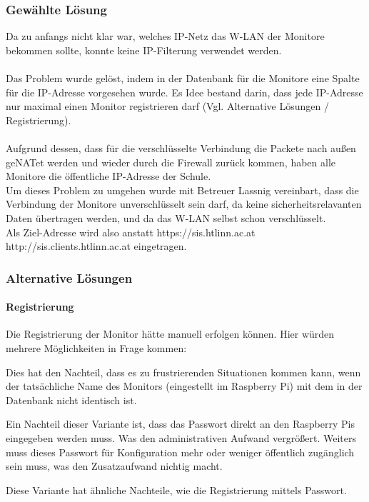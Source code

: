 \subsubsection{Gewählte Lösung}

Da zu anfangs nicht klar war, welches IP-Netz das W-LAN der Monitore bekommen sollte, konnte keine IP-Filterung verwendet werden.\\
\\
Das Problem wurde gelöst, indem in der Datenbank für die Monitore eine Spalte für die IP-Adresse vorgesehen wurde. Es Idee bestand darin, dass jede IP-Adresse nur maximal einen Monitor registrieren darf (Vgl. Alternative Lösungen / Registrierung).\\
\\
Aufgrund dessen, dass für die verschlüsselte Verbindung die Packete nach außen geNATet werden und wieder durch die Firewall zurück kommen, haben alle Monitore die öffentliche IP-Adresse der Schule.\\
Um dieses Problem zu umgehen wurde mit Betreuer Lassnig vereinbart, dass die Verbindung der Monitore unverschlüsselt sein darf, da keine sicherheitsrelavanten Daten übertragen werden, und da das W-LAN selbst schon verschlüsselt.\\
Als Ziel-Adresse wird also anstatt https://sis.htlinn.ac.at http://sis.clients.htlinn.ac.at eingetragen.


\subsubsection{Alternative Lösungen}

\paragraph{Registrierung}

Die Registrierung der Monitor hätte manuell erfolgen können. Hier würden mehrere Möglichkeiten in Frage kommen:

\begin{description}[style=nextline]
	\item[Registrierung nur vom Administrator-Interface aus]
		Dies hat den Nachteil, dass es zu frustrierenden Situationen kommen kann, wenn der tatsächliche Name des Monitors (eingestellt im Raspberry Pi) mit dem in der Datenbank nicht identisch ist.\\
	\item[Registrierung mittels Passwort]
		Ein Nachteil dieser Variante ist, dass das Passwort direkt an den Raspberry Pis eingegeben werden muss. Was den administrativen Aufwand vergrößert.
		Weiters muss dieses Passwort für Konfiguration mehr oder weniger öffentlich zugänglich sein muss, was den Zusatzaufwand nichtig macht.
	\item[Registrierung mittels Cookie-Hash]
		Diese Variante hat ähnliche Nachteile, wie die Registrierung mittels Passwort.
\end{description}

